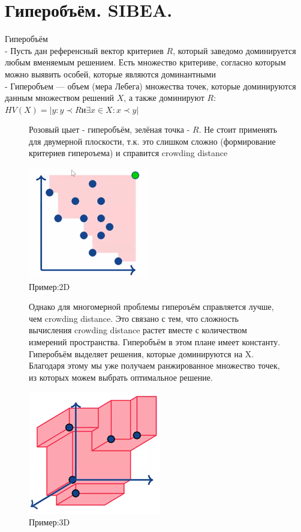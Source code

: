 \section{Гиперобъём. SIBEA.}
Гиперобъём\\
- Пусть дан референсный вектор критериев $R$, который заведомо доминируется
любым вменяемым решением. Есть множество критериве, согласно которым можно выявить особей, которые являются доминантными\\
- Гиперобъем — объем (мера Лебега) множества точек, которые доминируются
данным множеством решений $X$, а также доминируют $R$:\\
$HV(X) = |{y : y ≺ R и ∃x ∈X : x ≺ y}|$\\

\begin{figure}[!ht]
Розовый цыет - гиперобъём, зелёная точка - $R$. Не стоит применять для двумерной плоскости, т.к. это слишком сложно (формирование критериев гипероъема) и справится crowding distance
\begin{center}
    \includegraphics[width=0.3\linewidth]{images/hypervolume_2D.PNG}
    \caption{Пример:2D}
    \label{fig:mpr}
    
\end{center}
\end{figure}

\begin{figure}[!ht]
Однако для многомерной проблемы гипероъём справляется лучше, чем crowding distance.
Это связано с тем, что сложность вычисления crowding distance растет вместе с количеством измерений пространства. Гиперобъём в этом плане имеет константу.\\
Гиперобъём выделяет решения, которые доминируются на X. Благодаря этому мы уже получаем ранжированное множество точек, из которых можем выбрать оптимальное решение. 
\begin{center}
    \includegraphics[width=0.3\linewidth]{images/hypervolume_3D.PNG}
    \caption{Пример:3D}
    \label{fig:mpr}
    
\end{center}
\end{figure}

